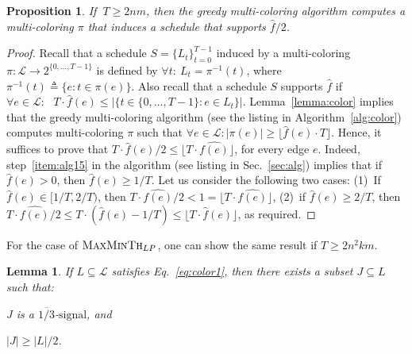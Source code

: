 \documentclass[11pt]{article}
\newenvironment{proof sketch}{\noindent {\bf Proof sketch:} }{\hfill \qed}
\newtheorem{proposition}{Proposition}
\newtheorem{lemma}{Lemma}
\newcommand{\LL}{\mathcal{L}}
\newcommand{\eqdf}{\triangleq}
\newcommand{\LPmin}{\textsc{MaxMinTh}_{LP}}
\newcommand{\barsignal}{$\text{signal}$}
\begin{document}
\begin{proposition}\label{prop:T}
  If  $~T\geq 2nm$, then the greedy multi-coloring algorithm computes a
  multi-coloring $\pi$ that induces a schedule that supports ${\hat f}/2$.
\end{proposition}
\begin{proof}
   Recall that a schedule $S=\{L_t\}_{t=0}^{T-1}$ induced by a multi-coloring 
   $\pi:\LL \rightarrow 2^{\{0,\ldots,T-1\}}$ is defined by 
   $\forall t:~L_t=\pi^{-1}(t)$, where $\pi^{-1}(t)\eqdf\{e: t\in \pi(e)\}$.
  Also recall that a schedule $S$ supports $\hat f$ if 
  $\forall e\in \LL:~~~  T \cdot {\hat f}(e) \leq \left|\{t\in \{0,\ldots,T-1\} : e\in L_t\}\right|$.
  Lemma~\ref{lemma:color} implies that the greedy multi-coloring algorithm 
  (see the listing in Algorithm~\ref{alg:color}) computes multi-coloring 
  $\pi$ such that $\forall e \in \LL : |\pi(e)| \geq \lfloor {\hat f}(e) \cdot T
    \rfloor$.
  Hence, it suffices to prove that $T \cdot \hat{f}(e)/2 \leq \lfloor T \cdot
  \hat{f(e)} \rfloor$, for every edge $e$. 
  Indeed, step~\ref{item:alg15} in the algorithm (see listing in Sec.~\ref{sec:alg}) 
  implies that if $\hat{f}(e)>0$, then $\hat{f}(e)\geq 1/T$. 
  Let us consider the following two cases: (1)~If $\hat{f}(e)\in [1/T,2/T)$, 
  then $T \cdot \hat{f(e)}/2 < 1=\lfloor T \cdot \hat{f(e)} \rfloor$, 
  (2)~if $\hat{f}(e)\geq 2/T$, then $T \cdot \hat{f(e)}/2 \leq T\cdot
  (\hat{f}(e) - 1/T) \leq \lfloor T \cdot \hat{f}(e) \rfloor$, as required.
\end{proof}
\noindent
For the case of $\LPmin$, one can show the same result if $T\geq 2n^2 km$.

\begin{lemma}\label{lemma:disperse}
  If $L\subseteq \LL$ satisfies Eq.~\ref{eq:color1}, then there exists
  a subset $J\subseteq L$ such that:
  \begin{inparaenum}[(i)]
  \item $J$ is a $\overline{1/3}$-\barsignal, and
  \item $|J|\geq |L|/2$.
  \end{inparaenum}
\end{lemma}
\end{document}
